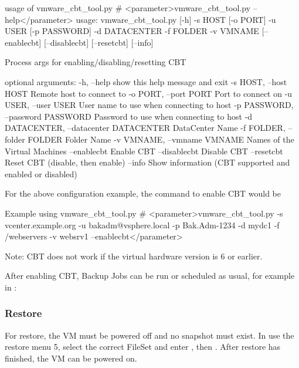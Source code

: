 \begin{commands}{usage of vmware\_cbt\_tool.py}
# <parameter>vmware_cbt_tool.py --help</parameter>
usage: vmware_cbt_tool.py [-h] -s HOST [-o PORT] -u USER [-p PASSWORD] -d
                          DATACENTER -f FOLDER -v VMNAME [--enablecbt]
                          [--disablecbt] [--resetcbt] [--info]

Process args for enabling/disabling/resetting CBT

optional arguments:
  -h, --help            show this help message and exit
  -s HOST, --host HOST  Remote host to connect to
  -o PORT, --port PORT  Port to connect on
  -u USER, --user USER  User name to use when connecting to host
  -p PASSWORD, --password PASSWORD
                        Password to use when connecting to host
  -d DATACENTER, --datacenter DATACENTER
                        DataCenter Name
  -f FOLDER, --folder FOLDER
                        Folder Name
  -v VMNAME, --vmname VMNAME
                        Names of the Virtual Machines
  --enablecbt           Enable CBT
  --disablecbt          Disable CBT
  --resetcbt            Reset CBT (disable, then enable)
  --info                Show information (CBT supported and enabled or
                        disabled)
\end{commands}

For the above configuration example, the command to enable CBT would be

\begin{commands}{Example using vmware\_cbt\_tool.py}
# <parameter>vmware_cbt_tool.py -s vcenter.example.org -u bakadm@vsphere.local -p Bak.Adm-1234 -d mydc1 -f /webservers -v websrv1 --enablecbt</parameter>
\end{commands}

Note: CBT does not work if the virtual hardware version is 6 or earlier.

After enabling CBT, Backup Jobs can be run or scheduled as usual,
for example in :


\subsubsection{Restore}

For restore, the VM must be powered off and no snapshot must exist.
In  use the restore menu 5, select the correct FileSet
and enter , then . After restore has finished,
the VM can be powered on.


